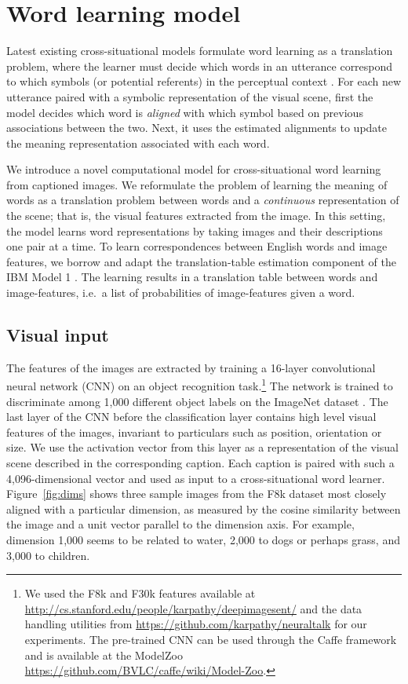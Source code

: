 

\section{Word learning model}
\label{sec:models}
Latest existing cross-situational models formulate word learning as a
translation problem, where the learner must decide which words in an
utterance correspond to which symbols (or potential referents) in the
perceptual context \citep{yu2007unified,fazly.etal.10csj}. For each new
utterance paired with a symbolic representation of the visual scene,
first the model decides which word is {\it aligned} with which symbol
based on previous associations between the two. Next, it uses the
estimated alignments to update the meaning representation associated
with each word.

We introduce a novel computational model for cross-situational word
learning from captioned images. We reformulate the problem of learning
the meaning of words as a translation problem between words and a {\it
  continuous} representation of the scene; that is, the visual
features extracted from the image. In this setting, the model learns
word representations by taking images and their descriptions one pair
at a time. To learn correspondences between English words and image
features, we borrow and adapt the translation-table estimation
component of the IBM Model 1 \citep{BrownPPM94}. The learning results
in a translation table between words and image-features, i.e.\ a list
of probabilities of image-features given a word.

\subsection{Visual input}
The features of the images are extracted by training a 16-layer
convolutional neural network (CNN) \citep{simonyan2014very} on an
object recognition task.\label{rev:cnndetail}\footnote{We used the F8k
  and F30k features available at
  \url{http://cs.stanford.edu/people/karpathy/deepimagesent/} and the
  data handling utilities from
  \url{https://github.com/karpathy/neuraltalk} for our
  experiments. The pre-trained CNN can be used through the Caffe
  framework \citep{jia2014caffe} and is available at the ModelZoo
  \url{https://github.com/BVLC/caffe/wiki/Model-Zoo}.} The network is
trained to discriminate among 1,000 different object labels on the
ImageNet dataset \citep{deng2009imagenet}. The last layer of the CNN
before the classification layer contains high level visual features of
the images, invariant to particulars such as position, orientation or
size.  We use the activation vector from this layer as a
representation of the visual scene described in the corresponding
caption. Each caption is paired with such a 4,096-dimensional vector
and used as input to a cross-situational word learner.
Figure~\ref{fig:dims} shows three sample images from the F8k
dataset most closely aligned with a particular dimension, as measured
by the cosine similarity between the image and a unit vector parallel
to the dimension axis. For example, dimension 1,000 seems to be related
to water, 2,000 to dogs or perhaps grass, and 3,000 to children.

